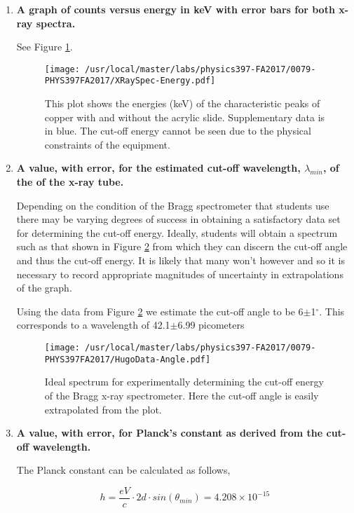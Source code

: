 \begin{enumerate}
\item {\bf A graph of counts versus energy in keV with error bars for both x-ray spectra.}\newline

See Figure \ref{fig:xrcg3}.

\begin{figure}
\texttt{[image: /usr/local/master/labs/physics397-FA2017/0079-PHYS397FA2017/XRaySpec-Energy.pdf]}
\caption{This plot shows the energies (keV) of the characteristic peaks of copper with and without the acrylic slide. Supplementary data is in blue. The cut-off energy cannot be seen due to the physical constraints of the equipment. }
\label{fig:xrcg3}
\end{figure}

\item {\bf A value, with error, for the estimated cut-off wavelength, $\lambda_{min}$, of the of the x-ray tube.}\newline

Depending on the condition of the Bragg spectrometer that students use there may be varying degrees of success in obtaining a satisfactory data set for determining the cut-off energy. Ideally, students will obtain a spectrum such as that shown in Figure \ref{fig:xrcg4} from which they can discern the cut-off angle and thus the cut-off energy. It is likely that many won't however and so it is necessary to record appropriate magnitudes of uncertainty in extrapolations of the graph. 

Using the data from Figure \ref{fig:xrcg4} we estimate the cut-off angle to be 6$\pm$1$^{\circ}$. This corresponds to a wavelength of 42.1$\pm$6.99 picometers

\begin{figure}
\texttt{[image: /usr/local/master/labs/physics397-FA2017/0079-PHYS397FA2017/HugoData-Angle.pdf]}
\caption{Ideal spectrum for experimentally determining the cut-off energy of the Bragg x-ray spectrometer. Here the cut-off angle is easily extrapolated from the plot.}
\label{fig:xrcg4}
\end{figure}

\item {\bf A value, with error, for Planck's constant as derived from the cut-off wavelength.}\newline

The Planck constant can be calculated as follows,

\begin{equation}
h=\dfrac{eV}{c}\cdot 2d\cdot sin(\theta_{min})=4.208\times10^{-15}
\label{equ:twcg3}
\end{equation}


\end{enumerate}
